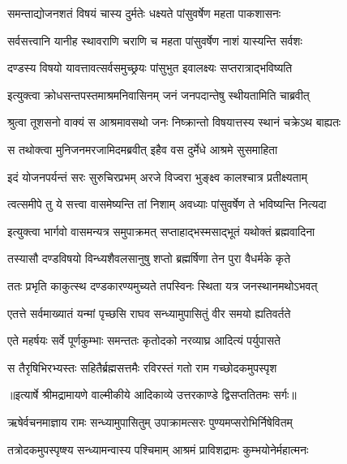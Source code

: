 \twolineshloka
{समन्ताद्योजनशतं विषयं चास्य दुर्मतेः}
{धक्ष्यते पांसुवर्षेण महता पाकशासनः} %

\twolineshloka
{सर्वसत्त्वानि यानीह स्थावराणि चराणि च}
{महता पांसुवर्षेण नाशं यास्यन्ति सर्वशः} %

\twolineshloka
{दण्डस्य विषयो यावत्तावत्सर्वसमुच्छ्रयः}
{पांसुभुत इवालक्ष्यः सप्तरात्राद्भविष्यति} %

\twolineshloka
{इत्युक्त्वा क्रोधसन्तपस्तमाश्रमनिवासिनम्}
{जनं जनपदान्तेषु स्थीयतामिति चाब्रवीत्} %

\twolineshloka
{श्रुत्वा तूशसनो वाक्यं स आश्रमावसथो जनः}
{निष्क्रान्तो विषयात्तस्य स्थानं चक्रेऽथ बाह्यतः} %

\twolineshloka
{स तथोक्त्वा मुनिजनमरजामिदमब्रवीत्}
{इहैव वस दुर्मेधे आश्रमे सुसमाहिता} %

\twolineshloka
{इदं योजनपर्यन्तं सरः सुरुचिरप्रभम्}
{अरजे विज्वरा भुङ्क्ष्व कालश्चात्र प्रतीक्ष्यताम्} %

\twolineshloka
{त्वत्समीपे तु ये सत्त्वा वासमेष्यन्ति तां निशाम्}
{अवध्याः पांसुवर्षेण ते भविष्यन्ति नित्यदा} %

\twolineshloka
{इत्युक्त्वा भार्गवो वासमन्यत्र समुपाक्रमत्}
{सप्ताहाद्भस्मसाद्भूतं यथोक्तं ब्रह्मवादिना} %

\twolineshloka
{तस्यासौ दण्डविषयो विन्ध्यशैवलसानुषु}
{शप्तो ब्रह्मर्षिणा तेन पुरा वैधर्मके कृते} %

\twolineshloka
{ततः प्रभृति काकुत्स्थ दण्डकारण्यमुच्यते}
{तपस्विनः स्थिता यत्र जनस्थानमथोऽभवत्} %

\twolineshloka
{एतत्ते सर्वमाख्यातं यन्मां पृच्छसि राघव}
{सन्ध्यामुपासितुं वीर समयो ह्यतिवर्तते} %

\twolineshloka
{एते महर्षयः सर्वे पूर्णकुम्भाः समन्ततः}
{कृतोदको नरव्याघ्र आदित्यं पर्युपासते} %

\twolineshloka
{स तैरृषिभिरभ्यस्तः सहितैर्ब्रह्मसत्तमैः}
{रविरस्तं गतो राम गच्छोदकमुपस्पृश} %


{॥इत्यार्षे श्रीमद्रामायणे वाल्मीकीये आदिकाव्ये उत्तरकाण्डे द्विसप्ततितमः सर्गः॥}


\twolineshloka
{ऋषेर्वचनमाज्ञाय रामः सन्ध्यामुपासितुम्}
{उपाक्रामत्सरः पुण्यमप्सरोभिर्निषेवितम्} %

\twolineshloka
{तत्रोदकमुपस्पृष्श्य सन्ध्यामन्वास्य पश्चिमाम्}
{आश्रमं प्राविशद्रामः कुम्भयोनेर्महात्मनः} %

